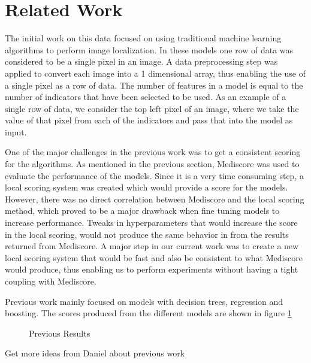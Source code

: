 \section{Related Work}


The initial work on this data focused on using traditional machine learning algorithms to perform image localization. In these models one 
row of data was considered to be a single pixel in an image. A data preprocessing step was applied to convert each image into a 1 dimensional
array, thus enabling the use of a single pixel as a row of data. The number of features in a model is equal to the number of indicators 
that have been selected to be used. As an example of a single row of data, we consider the top left pixel of an image, where we take the 
value of that pixel from each of the indicators and pass that into the model as input.

One of the major challenges in the previous work was to get a consistent scoring for the algorithms. As mentioned in the previous section, 
Mediscore was used to evaluate the performance of the models. Since it is a very time consuming step, a local scoring system was created which 
would provide a score for the models. However, there was no direct correlation between Mediscore and the local scoring method, which proved 
to be a major drawback when fine tuning models to increase performance. Tweaks in hyperparameters that would increase the score in the 
local scoring, would not produce the same behavior in from the results returned from Mediscore. A major step in our current work was to 
create a new local scoring system that would be fast and also be consistent to what Mediscore would produce, thus enabling us to perform 
experiments without having a tight coupling with Mediscore.

Previous work mainly focused on models with decision trees, regression and boosting. The scores produced from the different models are shown in 
figure \ref{fig:previous_results_table}

\begin{figure}
    \centering
    \caption{Previous Results}
    \label{fig:previous_results_table}
\end{figure}

Get more ideas from Daniel about previous work

